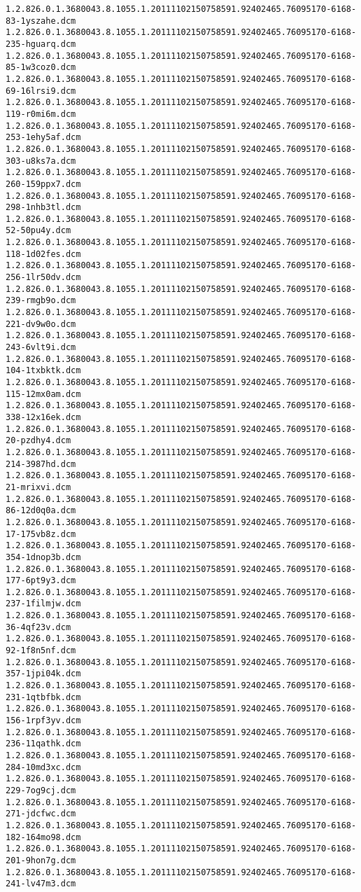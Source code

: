 \begin{lstlisting}
1.2.826.0.1.3680043.8.1055.1.20111102150758591.92402465.76095170-6168-83-1yszahe.dcm 1.2.826.0.1.3680043.8.1055.1.20111102150758591.92402465.76095170-6168-235-hguarq.dcm 1.2.826.0.1.3680043.8.1055.1.20111102150758591.92402465.76095170-6168-85-1w3coz0.dcm 1.2.826.0.1.3680043.8.1055.1.20111102150758591.92402465.76095170-6168-69-16lrsi9.dcm 1.2.826.0.1.3680043.8.1055.1.20111102150758591.92402465.76095170-6168-119-r0mi6m.dcm 1.2.826.0.1.3680043.8.1055.1.20111102150758591.92402465.76095170-6168-253-1ehy5af.dcm 1.2.826.0.1.3680043.8.1055.1.20111102150758591.92402465.76095170-6168-303-u8ks7a.dcm 1.2.826.0.1.3680043.8.1055.1.20111102150758591.92402465.76095170-6168-260-159ppx7.dcm 1.2.826.0.1.3680043.8.1055.1.20111102150758591.92402465.76095170-6168-298-1nhb3tl.dcm 1.2.826.0.1.3680043.8.1055.1.20111102150758591.92402465.76095170-6168-52-50pu4y.dcm 1.2.826.0.1.3680043.8.1055.1.20111102150758591.92402465.76095170-6168-118-1d02fes.dcm 1.2.826.0.1.3680043.8.1055.1.20111102150758591.92402465.76095170-6168-256-1lr50dv.dcm 1.2.826.0.1.3680043.8.1055.1.20111102150758591.92402465.76095170-6168-239-rmgb9o.dcm 1.2.826.0.1.3680043.8.1055.1.20111102150758591.92402465.76095170-6168-221-dv9w0o.dcm 1.2.826.0.1.3680043.8.1055.1.20111102150758591.92402465.76095170-6168-243-6vlt9i.dcm 1.2.826.0.1.3680043.8.1055.1.20111102150758591.92402465.76095170-6168-104-1txbktk.dcm 1.2.826.0.1.3680043.8.1055.1.20111102150758591.92402465.76095170-6168-115-12mx0am.dcm 1.2.826.0.1.3680043.8.1055.1.20111102150758591.92402465.76095170-6168-338-12x16ek.dcm 1.2.826.0.1.3680043.8.1055.1.20111102150758591.92402465.76095170-6168-20-pzdhy4.dcm 1.2.826.0.1.3680043.8.1055.1.20111102150758591.92402465.76095170-6168-214-3987hd.dcm 1.2.826.0.1.3680043.8.1055.1.20111102150758591.92402465.76095170-6168-21-mrixvi.dcm 1.2.826.0.1.3680043.8.1055.1.20111102150758591.92402465.76095170-6168-86-12d0q0a.dcm 1.2.826.0.1.3680043.8.1055.1.20111102150758591.92402465.76095170-6168-17-175vb8z.dcm 1.2.826.0.1.3680043.8.1055.1.20111102150758591.92402465.76095170-6168-354-1dnop3b.dcm 1.2.826.0.1.3680043.8.1055.1.20111102150758591.92402465.76095170-6168-177-6pt9y3.dcm 1.2.826.0.1.3680043.8.1055.1.20111102150758591.92402465.76095170-6168-237-1filmjw.dcm 1.2.826.0.1.3680043.8.1055.1.20111102150758591.92402465.76095170-6168-36-4qf23v.dcm 1.2.826.0.1.3680043.8.1055.1.20111102150758591.92402465.76095170-6168-92-1f8n5nf.dcm 1.2.826.0.1.3680043.8.1055.1.20111102150758591.92402465.76095170-6168-357-1jpi04k.dcm 1.2.826.0.1.3680043.8.1055.1.20111102150758591.92402465.76095170-6168-231-1qtbfbk.dcm 1.2.826.0.1.3680043.8.1055.1.20111102150758591.92402465.76095170-6168-156-1rpf3yv.dcm 1.2.826.0.1.3680043.8.1055.1.20111102150758591.92402465.76095170-6168-236-11qathk.dcm 1.2.826.0.1.3680043.8.1055.1.20111102150758591.92402465.76095170-6168-284-10md3xc.dcm 1.2.826.0.1.3680043.8.1055.1.20111102150758591.92402465.76095170-6168-229-7og9cj.dcm 1.2.826.0.1.3680043.8.1055.1.20111102150758591.92402465.76095170-6168-271-jdcfwc.dcm 1.2.826.0.1.3680043.8.1055.1.20111102150758591.92402465.76095170-6168-182-164mo98.dcm 1.2.826.0.1.3680043.8.1055.1.20111102150758591.92402465.76095170-6168-201-9hon7g.dcm 1.2.826.0.1.3680043.8.1055.1.20111102150758591.92402465.76095170-6168-241-lv47m3.dcm 
\end{lstlisting}
